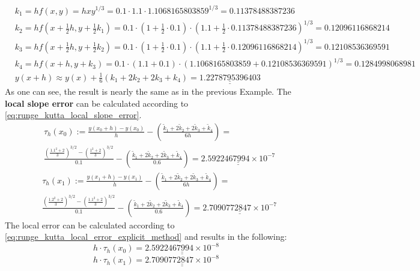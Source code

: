 $$
\begin{aligned}
& k_1=h f(x, y)=h x y^{1 / 3} = 0.1\cdot 1.1 \cdot 1.1068165803859^{1/3}=0.11378488387236 \\
& k_2=h f\left(x+\frac{1}{2} h, y+\frac{1}{2} k_1\right)=0.1\cdot (1+\frac{1}{2}\cdot 0.1)\cdot (1.1+\frac{1}{2}\cdot 0.11378488387236)^{1/3}=0.12096116868214 \\
& k_3=h f\left(x+\frac{1}{2} h, y+\frac{1}{2} k_2\right)= 0.1\cdot (1+\frac{1}{2}\cdot 0.1)\cdot (1.1+\frac{1}{2}\cdot 0.12096116868214)^{1/3}=0.12108536369591 \\
& k_4=h f\left(x+h, y+k_3\right)=0.1 \cdot (1.1+0.1)\cdot (1.1068165803859+0.12108536369591)^{1/3}=0.1284998068981 \\
& y(x+h) \approx y(x)+\frac{1}{6}\left(k_1+2 k_2+2 k_3+k_4\right)=\underline{\underline{1.2278795396403}}
\end{aligned}
$$
As one can see, the result is nearly the same as in the previous Example. The \textbf{local slope error} can be calculated according to \autoref{eq:runge_kutta_local_slope_error}.
$$
\begin{aligned}
& \tau_h\left(x_0\right):=\frac{y\left(x_0+h\right)-y\left(x_0\right)}{h}-\left(\frac{\tilde{k}_1+2 \tilde{k}_2+2 \tilde{k}_3+\tilde{k}_4}{6 h}\right)= \\
& \frac{\left(\frac{1.1^2+2}{3}\right)^{3 / 2}-\left(\frac{1^2+2}{3}\right)^{3 / 2}}{0.1}-\left(\frac{\tilde{k}_1+2 \tilde{k}_2+2 \tilde{k}_3+\tilde{k}_4}{0.6}\right)=\underline{\underline{2.5922467994 \times 10^{-7}}}
\end{aligned}
$$
$$
\begin{aligned}
& \tau_h\left(x_1\right):=\frac{y\left(x_1+h\right)-y\left(x_1\right)}{h}-\left(\frac{\tilde{k}_1+2 \tilde{k}_2+2 \tilde{k}_3+\tilde{k}_4}{6 h}\right)= \\
& \frac{\left(\frac{1.2^2+2}{3}\right)^{3 / 2}-\left(\frac{1.1^2+2}{3}\right)^{3 / 2}}{0.1}-\left(\frac{\tilde{k}_1+2 \tilde{k}_2+2 \tilde{k}_3+\tilde{k}_4}{0.6}\right)=\underline{\underline{2.7090772847 \times 10^{-7}}}
\end{aligned}
$$
The local error can be calculated according to \autoref{eq:runge_kutta_local_error_explicit_method} and results in the following:
$$
h \cdot \tau_h\left(x_0\right)=\underline{\underline{2.5922467994 \times 10^{-8}}}
$$
$$
h \cdot \tau_h\left(x_1\right)=\underline{\underline{2.7090772847 \times 10^{-8}}}
$$


